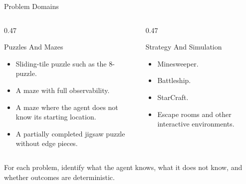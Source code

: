 \documentclass[aspectratio=169,10pt]{beamer}
\begin{document}
\begin{frame}{Problem Domains}
  \begin{columns}[T,onlytextwidth]
    \begin{column}{0.47\textwidth}
      \begin{block}{Puzzles And Mazes}
        \begin{itemize}
          \item Sliding-tile puzzle such as the 8-puzzle.
          \item A maze with full observability.
          \item A maze where the agent does not know its starting location.
          \item A partially completed jigsaw puzzle without edge pieces.
        \end{itemize}
      \end{block}
    \end{column}
    \begin{column}{0.47\textwidth}
      \begin{block}{Strategy And Simulation}
        \begin{itemize}
          \item Minesweeper.
          \item Battleship.
          \item StarCraft.
          \item Escape rooms and other interactive environments.
        \end{itemize}
      \end{block}
    \end{column}
  \end{columns}
  \vspace{0.08in}
  \begin{activity}
    For each problem, identify what the agent knows, what it does not know, and whether outcomes are deterministic.
  \end{activity}
\end{frame}
\end{document}

